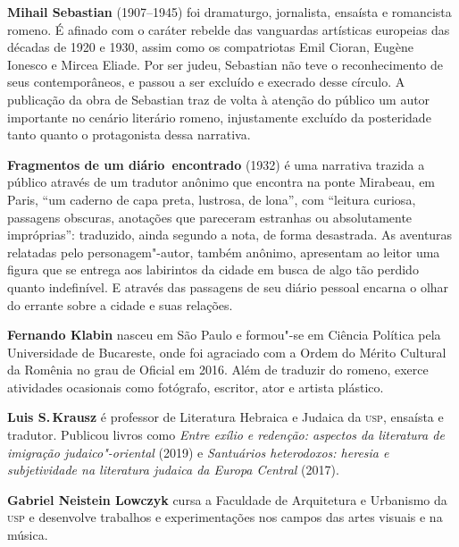 
\textbf{Mihail Sebastian} (1907--1945) foi dramaturgo, jornalista, ensaísta e romancista romeno. É afinado com o caráter rebelde das vanguardas artísticas europeias das décadas de 1920 e 1930, assim como os compatriotas Emil Cioran, Eugène Ionesco e Mircea Eliade. Por ser judeu, Sebastian não teve o reconhecimento de seus contemporâneos, e passou a ser excluído e execrado desse círculo. A publicação da obra de Sebastian traz de volta à atenção do público um autor importante no cenário literário romeno, injustamente excluído da posteridade tanto quanto o protagonista dessa narrativa.

\textbf{Fragmentos de um diário~encontrado} (1932) é uma narrativa trazida a público através de um tradutor anônimo que encontra na ponte Mirabeau, em Paris, ``um caderno de capa preta, lustrosa, de lona'', com ``leitura curiosa, passagens obscuras, anotações que pareceram estranhas ou absolutamente impróprias'': traduzido, ainda segundo a nota, de forma desastrada. As aventuras relatadas pelo personagem"-autor, também anônimo, apresentam ao leitor uma figura que se entrega aos labirintos da cidade em busca de algo tão perdido quanto indefinível. E através das passagens de seu diário pessoal encarna o olhar do errante sobre a cidade e suas relações.


\textbf{Fernando Klabin} nasceu em São Paulo e formou"-se em Ciência Política pela Universidade de Bucareste, onde foi agraciado com a Ordem do Mérito Cultural da Romênia no grau de Oficial em 2016. Além de traduzir do romeno, exerce atividades ocasionais como fotógrafo, escritor, ator e artista plástico.

\textbf{Luis S.\,Krausz} é professor de Literatura Hebraica e Judaica da \textsc{usp}, ensaísta e tradutor. Publicou livros como \textit{Entre exílio e redenção: aspectos da literatura de imigração judaico"-oriental} (2019) e \textit{Santuários heterodoxos: heresia e subjetividade na literatura judaica da Europa Central} (2017).

\textbf{Gabriel Neistein Lowczyk} cursa a Faculdade de Arquitetura e Urbanismo da \textsc{usp} e desenvolve trabalhos e experimentações nos campos das artes visuais e na música.

